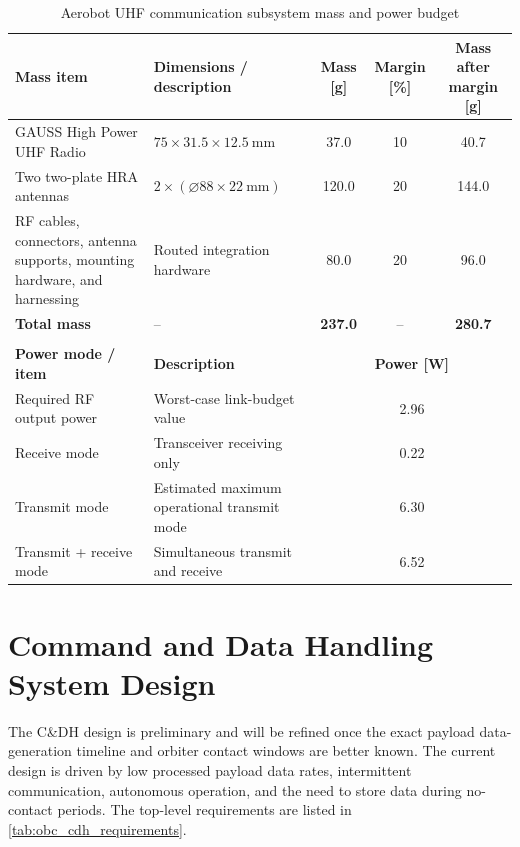 \begin{table}[H]
\centering
\small
\caption{Aerobot UHF communication subsystem mass and power budget}
\label{tab:uhf_mass_power_budget}
\renewcommand{\arraystretch}{1.12}
\setlength{\tabcolsep}{4pt}
\begin{tabular}{p{4.5cm} p{3.4cm} c c c}
\hline
\textbf{Mass item} & \textbf{Dimensions / description} & \textbf{Mass [g]} & \textbf{Margin [\%]} & \textbf{Mass after margin [g]} \\
\hline
GAUSS High Power UHF Radio & \(75 \times 31.5 \times 12.5~\mathrm{mm}\) & 37.0 & 10 & 40.7 \\
Two two-plate HRA antennas & \(2 \times (\varnothing 88 \times 22~\mathrm{mm})\) & 120.0 & 20 & 144.0 \\
RF cables, connectors, antenna supports, mounting hardware, and harnessing & Routed integration hardware & 80.0 & 20 & 96.0 \\
\hline
\textbf{Total mass} & -- & \textbf{237.0} & -- & \textbf{280.7} \\
\hline
\multicolumn{5}{c}{} \\
\hline
\textbf{Power mode / item} & \textbf{Description} & \multicolumn{3}{c}{\textbf{Power [W]}} \\
\hline
Required RF output power & Worst-case link-budget value & \multicolumn{3}{c}{2.96} \\
Receive mode & Transceiver receiving only & \multicolumn{3}{c}{0.22} \\
Transmit mode & Estimated maximum operational transmit mode & \multicolumn{3}{c}{6.30} \\
Transmit + receive mode & Simultaneous transmit and receive & \multicolumn{3}{c}{6.52} \\
\hline
\end{tabular}
\end{table}


\section{Command and Data Handling System Design}

The C\&DH design is preliminary and will be refined once the exact payload data-generation timeline and orbiter contact windows are better known. The current design is driven by low processed payload data rates, intermittent communication, autonomous operation, and the need to store data during no-contact periods. The top-level requirements are listed in \autoref{tab:obc_cdh_requirements}.

